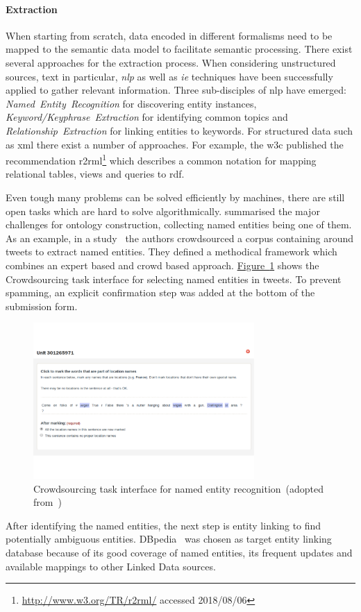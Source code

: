 \paragraph{Extraction} When starting from scratch, data encoded in different formalisms need to be mapped to the semantic data model to facilitate semantic processing. 
There exist several approaches for the extraction process. When considering unstructured sources, text in particular, \emph{\gls{nlp}} as well as \emph{\gls{ie}} techniques have been successfully applied to gather relevant information. Three sub-disciples of \gls{nlp} have emerged: \emph{Named~Entity~Recognition} for discovering entity instances, \emph{Keyword/Keyphrase~Extraction} for identifying common topics and \emph{Relationship~Extraction} for linking entities to keywords. For structured data such as \gls{xml} there exist a number of approaches. For example, the \gls{w3c} published the recommendation \gls{r2rml}\footnote{\url{http://www.w3.org/TR/r2rml/} accessed 2018/08/06} which describes a common notation for mapping relational tables, views and queries to \gls{rdf}. 

Even tough many problems can be solved efficiently by machines, there are still open tasks which are hard to solve algorithmically. \cite{siorpaes2008ontogame} summarised the major challenges for ontology construction, collecting named entities being one of them. 
As an example, in a study~\cite{bontcheva2017} the authors crowdsourced a corpus containing around  tweets to extract named entities. They defined a methodical framework which combines an expert based and crowd based approach. 
\hyperref[fig:named_entity_recognition]{Figure~\ref*{fig:named_entity_recognition}} shows the Crowdsourcing task interface for selecting named entities in tweets. To prevent spamming, an explicit confirmation step was added at the bottom of the submission form. 
\begin{figure}
	 \centering
	 \includegraphics[width=0.75\textwidth]{graphics/named_entity_recognition}
	 \caption{Crowdsourcing task interface for named entity recognition~(adopted from~\cite{bontcheva2017})}
	 \label{fig:named_entity_recognition}
\end{figure}  
After identifying the named entities, the next step is entity linking to find potentially ambiguous entities. DBpedia~\cite{auer2007} was chosen as target entity linking database because of its good coverage of named entities, its frequent updates and available mappings to other Linked Data sources. 


